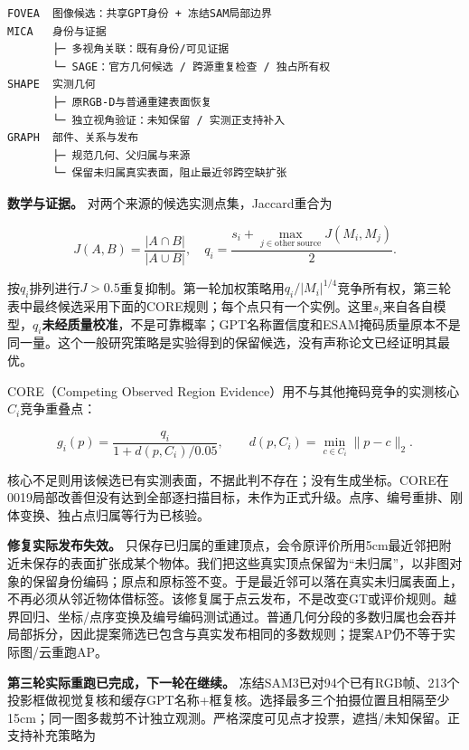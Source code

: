 \documentclass[UTF8,fontset=fandol]{ctexart}
\begin{document}
\begin{verbatim}
FOVEA  图像候选：共享GPT身份 + 冻结SAM局部边界
MICA   身份与证据
       ├─ 多视角关联：既有身份/可见证据
       └─ SAGE：官方几何候选 / 跨源重复检查 / 独占所有权
SHAPE  实测几何
       ├─ 原RGB-D与普通重建表面恢复
       └─ 独立视角验证：未知保留 / 实测正支持补入
GRAPH  部件、关系与发布
       ├─ 规范几何、父归属与来源
       └─ 保留未归属真实表面，阻止最近邻跨空缺扩张
\end{verbatim}


\textbf{数学与证据。} 对两个来源的候选实测点集，Jaccard重合为



\[
J(A,B)=\frac{|A\cap B|}{|A\cup B|},\quad q_i=\frac{s_i+\max_{j\in\mathrm{other\ source}}J(M_i,M_j)}{2}.
\]

按$q_i$排列进行$J>0.5$重复抑制。第一轮加权策略用$q_i/|M_i|^{1/4}$竞争所有权，第三轮表中最终候选采用下面的CORE规则；每个点只有一个实例。这里$s_i$来自各自模型，$q_i$\textbf{未经质量校准}，不是可靠概率；GPT名称置信度和ESAM掩码质量原本不是同一量。这个一般研究策略是实验得到的保留候选，没有声称论文已经证明其最优。



CORE（Competing Observed Region Evidence）用不与其他掩码竞争的实测核心$C_i$竞争重叠点：



\[
g_i(p)=\frac{q_i}{1+d(p,C_i)/0.05},\qquad d(p,C_i)=\min_{c\in C_i}\|p-c\|_2.
\]

核心不足则用该候选已有实测表面，不据此判不存在；没有生成坐标。CORE在0019局部改善但没有达到全部逐扫描目标，未作为正式升级。点序、编号重排、刚体变换、独占点归属等行为已核验。



\textbf{修复实际发布失效。} 只保存已归属的重建顶点，会令原评价所用5cm最近邻把附近未保存的表面扩张成某个物体。我们把这些真实顶点保留为“未归属”，以非图对象的保留身份编码；原点和原标签不变。于是最近邻可以落在真实未归属表面上，不再必须从邻近物体借标签。该修复属于点云发布，不是改变GT或评价规则。越界回归、坐标/点序变换及编号编码测试通过。普通几何分段的多数归属也会吞并局部拆分，因此提案筛选已包含与真实发布相同的多数规则；提案AP仍不等于实际图/云重跑AP。



\textbf{第三轮实际重跑已完成，下一轮在继续。} 冻结SAM3已对94个已有RGB帧、213个投影框做视觉复核和缓存GPT名称+框复核。选择最多三个拍摄位置且相隔至少15cm；同一图多裁剪不计独立观测。严格深度可见点才投票，遮挡/未知保留。正支持补充策略为
\end{document}
